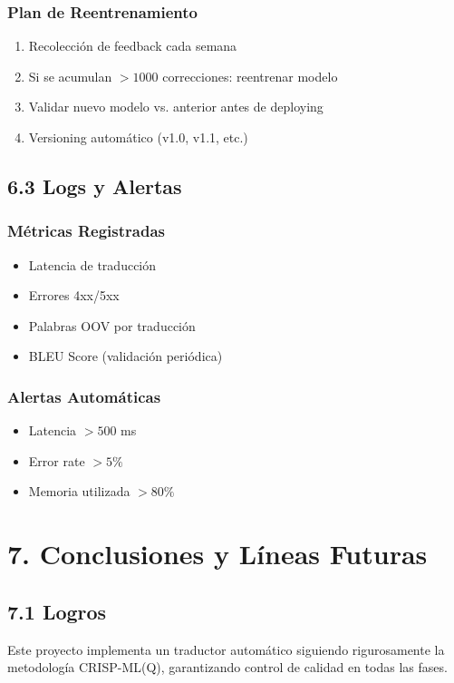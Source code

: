 \documentclass[12pt,a4paper]{article}
\begin{document}
\subsubsection{Plan de Reentrenamiento}
\begin{enumerate}
    \item Recolección de feedback cada semana
    \item Si se acumulan $> 1000$ correcciones: reentrenar modelo
    \item Validar nuevo modelo vs. anterior antes de deploying
    \item Versioning automático (v1.0, v1.1, etc.)
\end{enumerate}

\subsection{6.3 Logs y Alertas}

\subsubsection{Métricas Registradas}
\begin{itemize}
    \item Latencia de traducción
    \item Errores 4xx/5xx
    \item Palabras OOV por traducción
    \item BLEU Score (validación periódica)
\end{itemize}

\subsubsection{Alertas Automáticas}
\begin{itemize}
    \item Latencia $> 500$ ms
    \item Error rate $> 5\%$
    \item Memoria utilizada $> 80\%$
\end{itemize}

\section{7. Conclusiones y Líneas Futuras}

\subsection{7.1 Logros}
Este proyecto implementa un traductor automático siguiendo rigurosamente la metodología CRISP-ML(Q), garantizando control de calidad en todas las fases.
\end{document}
